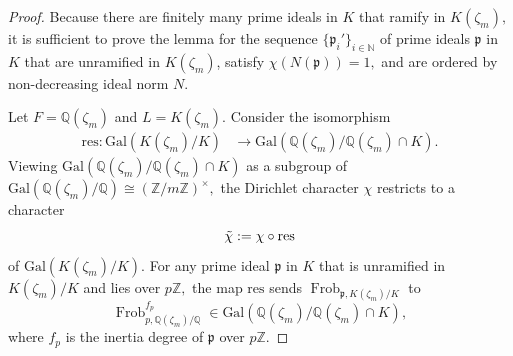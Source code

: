 \documentclass[12pt]{amsart}
\theoremstyle{definition}
\numberwithin{equation}{section}
\newcommand{\Gal}{\text{Gal}}
\newcommand{\ra}{\rightarrow}
\newcommand{\res}{\text{res}}
\newcommand{\p}{\mathfrak{p}}
\newcommand{\Q}{\mathbb{Q}}
\newcommand{\Z}{\mathbb{Z}}
\newcommand{\N}{\mathbb{N}}
\newcommand{\Frob}{\operatorname{Frob}}
\begin{document}
\begin{proof}
    Because there are finitely many prime ideals in $K$ that ramify in $K(\zeta_m),$ it is sufficient to prove the lemma for the sequence $\{\mathfrak p_i'\}_{i \in \N}$ of prime ideals $\p$ in $K$ that are unramified in $K(\zeta_m)$, satisfy $\chi(N(\p)) = 1,$ and are ordered by non-decreasing ideal norm $N$.
    
    Let $F = \Q(\zeta_m)$ and $L = K(\zeta_m).$ 
    Consider the isomorphism
    \begin{align*}
        \text{res} : \Gal(K(\zeta_m)/K) &\ra \Gal(\Q(\zeta_m)/\Q(\zeta_m) \cap K).
    \end{align*} Viewing $\Gal(\Q(\zeta_m)/\Q(\zeta_m) \cap K)$ as a subgroup of $\Gal(\Q(\zeta_m) / \Q) \cong (\Z/ m\Z)^\times,$ the Dirichlet character $\chi$ restricts to a character $$\Tilde{\chi} := \chi \circ \text{res}$$ of $\Gal(K(\zeta_m) / K).$
    For any prime ideal $\mathfrak{p}$ in $K$ that is unramified in $K(\zeta_m)/K$ and lies over $p\Z,$ the map $\res$ sends $\Frob_{\mathfrak{p}, K(\zeta_m)/K}$ to $$\Frob_{p, \Q(\zeta_m)/\Q}^{f_p} \in \Gal(\Q(\zeta_m) / \Q(\zeta_m) \cap K),$$ where $f_p$ is the inertia degree of $\p$ over $p\Z.$ %
    

\end{proof}
\end{document}
